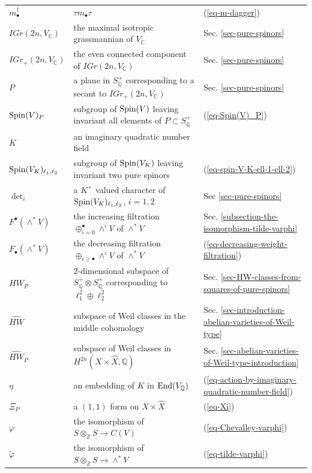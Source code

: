 \documentclass[12pt]{amsart}
\numberwithin{equation}{subsection}
\theoremstyle{plain}
\theoremstyle{definition}
\newcommand{\CC}{{\mathbb C}}
\newcommand{\QQ}{{\mathbb Q}}
\newcommand{\ZZ}{{\mathbb Z}}
\newcommand{\cm}{\eta}
\newcommand{\Spin}{{\rm Spin}}
\newcommand{\End}{{\rm End}}
\begin{document}
\begin{longtable}{l l l}
$m_{\bullet}^\dagger$ & $\tau m_{\bullet}\tau$ & (\ref{eq-m-dagger})
\\
$IGr(2n,V_\CC)$ & the maximal isotropic grassmannian of $V_\CC$ & Sec. \ref{sec-pure-spinors}
\\
$IGr_+(2n,V_\CC)$ & the even connected component of $IGr(2n,V_\CC)$ & Sec. \ref{sec-pure-spinors}
\\
$P$ & a plane in $S^+_\QQ$ corresponding to a secant to $IGr_+(2n,V_\CC)$ & Sec. \ref{sec-pure-spinors}
\\
$\Spin(V)_P$ & subgroup of $\Spin(V)$ leaving invariant all elements of $P\subset S^+_\QQ$ & (\ref{eq-Spin(V)_P})
\\
$K$ & an imaginary quadratic number field & \hspace{1ex}
\\
$\Spin(V_K)_{\ell_1,\ell_2}$ & subgroup of $\Spin(V_K)$ leaving invariant two pure spinors  & (\ref{eq-spin-V-K-ell-1-ell-2})
\\
$\det_i$ & a $K^\times$ valued character of $\Spin(V_K)_{\ell_1,\ell_2}$, $i=1,2$ & Sec \ref{sec-pure-spinors}
\\ 
$F^\bullet(\wedge^*V)$ & the increasing filtration $\oplus_{i=0}^\bullet\wedge^iV$ of $\wedge^*V$ & Sec. \ref{subsection-the-isomorphism-tilde-varphi}
\\
$F_\bullet(\wedge^*V)$ & the decreasing filtration $\oplus_{i\geq\bullet}\wedge^iV$ of $\wedge^*V$ & (\ref{eq-decreasing-weight-filtration})
\\
$HW_P$ & $2$-dimensional subspace of $S^+_\QQ\otimes S^+_\QQ$ corresponding to $\ell_1^2\oplus \ell_2^2$ & Sec. \ref{sec-HW-classes-from-squares-of-pure-spinors}
\\
$\hat{HW}$ &  subspace of Weil classes in the middle cohomology& Sec. \ref{sec-introduction-abelian-varieties-of-Weil-type}
\\
$\hat{HW}_P$ &  subspace of Weil classes in  $H^{2n}(X\times\hat{X},\QQ)$ & Sec. \ref{sec-abelian-varieties-of-Weil-type-introduction}
\\
$\cm$ & an embedding of $K$ in $\End(V_\QQ)$ & (\ref{eq-action-by-imaginary-quadratic-number-field})
\\
$\Xi_P$ & a $(1,1)$ form on $X\times \hat{X}$ & (\ref{eq-Xi})
\\
$\varphi$ & the isomorphism of $S\otimes_\ZZ S\rightarrow C(V)$ & (\ref{eq-Chevalley-varphi}) 
\\
$\tilde{\varphi}$ & the isomorphism of $S\otimes_\ZZ S\rightarrow \wedge^*V$ & (\ref{eq-tilde-varphi})
\\

\end{longtable}
\end{document}
